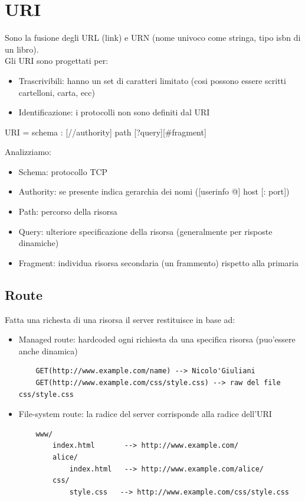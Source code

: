 \documentclass[a4paper,12pt]{article}
\begin{document}
\section{URI}
Sono la fusione degli URL (link) e URN (nome univoco come stringa, tipo isbn di un libro). \\
Gli URI sono progettati per:
\begin{itemize}
    \item Trascrivibili: hanno un set di caratteri limitato (cosi possono essere scritti cartelloni, carta, ecc)
    \item Identificazione: i protocolli non sono definiti dal URI
\end{itemize}
\begin{center}
    URI = schema : [//authority] path [?query][\#fragment]
\end{center}
Analizziamo:
\begin{itemize}
    \item Schema: protocollo TCP
    \item Authority: se presente indica gerarchia dei nomi ([userinfo @] host [: port])
    \item Path: percorso della risorsa
    \item Query: ulteriore specificazione della risorsa (generalmente per risposte dinamiche)
    \item Fragment: individua risorsa secondaria (un frammento) rispetto alla primaria
\end{itemize}
\subsection{Route}
Fatta una richesta di una risorsa il server restituisce in base ad:
\begin{itemize}
    \item Managed route: hardcoded ogni richiesta da una specifica risorsa (puo'essere anche dinamica)
    \begin{lstlisting}
    GET(http://www.example.com/name) --> Nicolo'Giuliani
    GET(http://www.example.com/css/style.css) --> raw del file css/style.css
    \end{lstlisting}
    \item File-system route: la radice del server corrisponde alla radice dell'URI
    \begin{lstlisting}
    www/
        index.html       --> http://www.example.com/
        alice/
            index.html   --> http://www.example.com/alice/
        css/
            style.css   --> http://www.example.com/css/style.css
    \end{lstlisting}
\end{itemize}
\end{document}

